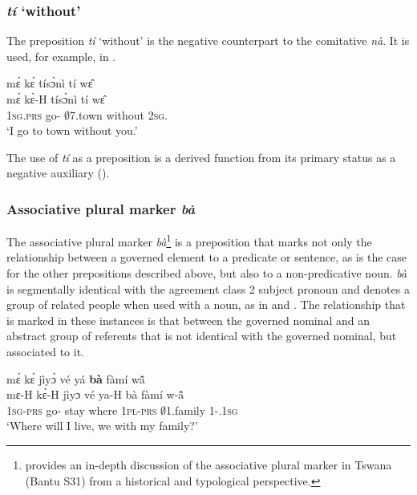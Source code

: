\subsubsection {{\itshape tí} `without'}

The preposition {\itshape tí} `without' is the negative counterpart to the comitative {\itshape nà}. It is used, for example, in .

\ea \label{withouttown}
  \glll    mɛ́ kɛ́ tísɔ̀nì tí wɛ̂\\
         mɛ́ kɛ̀-H tísɔ̀nì tí wɛ̂ \\
              1\textsc{sg}.\textsc{prs} go-{\R} $\emptyset$7.town without 2\textsc{sg}.{\OBJ} \\
    \trans `I go to town without you.'
\z


The use of {\itshape tí} as a preposition is a derived function from its primary status as a negative auxiliary ().


\largerpage[1]
\subsubsection{Associative plural marker {\itshape bà}}
\label{sec:AP}

The associative plural marker {\itshape bà}\footnote{\citet{creissels2016} provides an in-depth discussion of the associative plural marker in Tswana (Bantu S31) from a historical and typological perspective.} is a preposition that marks not only the relationship between a governed element to a predicate or sentence, as is the case for the other prepositions described above, but also to a non-predicative noun. {\itshape bà} is segmentally identical with the agreement class 2 subject pronoun and denotes a group of related people when used with a noun, as in  and . The relationship that is marked in these instances is that between the governed nominal and an abstract group of referents that is not identical with the governed nominal, but associated to it. 

\ea \label{AP1}
  \glll  mɛ́ kɛ́ jìyɔ̀ vé yá {\bfseries bà} fàmí wã̂ \\
          mɛ-H kɛ̀-H jìyɔ vé ya-H bà fàmí w-ã̂ \\
            1\textsc{sg}-\textsc{prs} go-{\R} stay where 1\textsc{pl}-\textsc{prs} {\AP} $\emptyset$1.family 1-{\POSS}.1\textsc{sg} \\
    \trans `Where will I live, we with my family?'
\z

